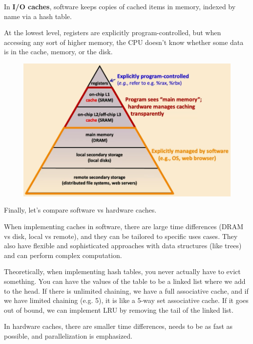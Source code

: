     In \textbf{I/O caches}, software keeps copies of cached items in memory, indexed by name via a hash table.

    At the lowest level, registers are explicitly program-controlled, but when accessing any sort of higher memory, the CPU doesn't know whether some data is in the cache, memory, or the disk. 

    \begin{figure}[H]
      \centering 
      \includegraphics[scale=0.4]{img/hierarchy2.png}
      \caption{} 
      \label{fig:hierarchy2}
    \end{figure}

    Finally, let's compare software vs hardware caches. 

    \begin{definition}
      When implementing caches in software, there are large time differences (DRAM vs disk, local vs remote), and they can be tailored to specific uses cases. They also have flexible and sophisticated approaches with data structures (like trees) and can perform complex computation. 
    \end{definition}

    Theoretically, when implementing hash tables, you never actually have to evict something. You can have the values of the table to be a linked list where we add to the head. If there is unlimited chaining, we have a full associative cache, and if we have limited chaining (e.g. 5), it is like a 5-way set associative cache. If it goes out of bound, we can implement LRU by removing the tail of the linked list. 

    \begin{definition}
      In hardware caches, there are smaller time differences, needs to be as fast as possible, and parallelization is emphasized. 
    \end{definition}


